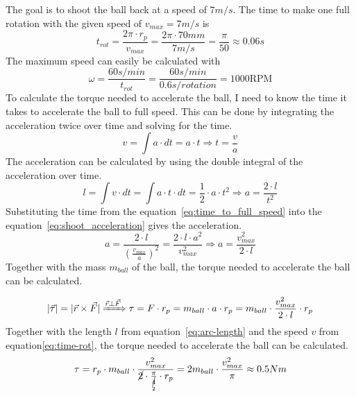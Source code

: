 The goal is to shoot the ball back at a speed of $7m/s$.
The time to make one full rotation with the given speed of $v_{max}=7m/s$ is
\begin{equation}
    \label{eq:time-rot}
    t_{rot} = \frac{2\pi\cdot r_p}{v_{max}} = \frac{2\pi\cdot 70mm}{7m/s} = \frac{\pi}{50} \approx 0.06s
\end{equation}
The maximum speed can easily be calculated with
\begin{equation}
    \label{eq:max_speed}
    \omega = \frac{60s/min}{t_{rot}} = \frac{60s/min}{0.6s/rotation} = 1000\text{RPM}
\end{equation}
To calculate the torque needed to accelerate the ball, I need to know the time it takes to accelerate the ball to full speed.
This can be done by integrating the acceleration twice over time and solving for the time.
\begin{equation}
    \label{eq:time_to_full_speed}
    v = \int a \cdot dt = a \cdot t \Rightarrow t=\frac{v}{a}
\end{equation}
The acceleration can be calculated by using the double integral of the acceleration over time.
\begin{equation}
    \label{eq:shoot_acceleration}
    l = \int v \cdot dt = \int a \cdot t \cdot dt = \frac{1}{2} \cdot a \cdot t^2 \Rightarrow a = \frac{2 \cdot l}{t^2}
\end{equation}
Substituting the time from the equation~\ref{eq:time_to_full_speed} into the equation~\ref{eq:shoot_acceleration} gives the acceleration.
\begin{equation}
    \label{eq:shoot_acceleration_substituted}
    a = \frac{2 \cdot l}{(\frac{v_{max}}{a})^2} = \frac{2 \cdot l \cdot a^2}{v_{max}^2} \Rightarrow a = \frac{v_{max}^2}{2 \cdot l}
\end{equation}
Together with the mass $m_{ball}$ of the ball, the torque needed to accelerate the ball can be calculated.

\begin{equation}
    \label{eq:torque_shoot}
    |\vec{\tau}| = |\vec{r} \times \vec{F}| \xRightarrow{\vec{r} \perp \vec{F}} \tau = F \cdot r_p = m_{ball} \cdot a \cdot r_p = m_{ball} \cdot \frac{v_{max}^2}{2 \cdot l} \cdot r_p
\end{equation}
Together with the length $l$ from equation~\ref{eq:arc-length} and the speed $v$ from equation\ref{eq:time-rot}, the torque needed to accelerate the ball can be calculated.
\begin{equation}
    \label{eq:torque_shoot_substituted}
    \tau = r_p \cdot m_{ball} \cdot \frac{v_{max}^2}{\cancel{2}\cdot\frac{\pi}{\underset{2}{\cancel{4}}}\cdot r_p} = 2m_{ball} \cdot \frac{v_{max}^2}{\pi} \approx 0.5Nm
\end{equation}



